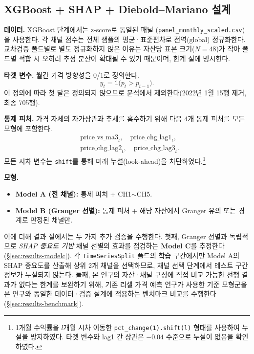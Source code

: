 \documentclass[11pt, a4paper, twocolumn]{article}
\begin{document}
\subsection{XGBoost + SHAP + Diebold--Mariano 설계}\label{sec:method-ml}

\textbf{데이터.} XGBoost 단계에서는 z-score로 통일된 패널
(\texttt{panel\_monthly\_scaled.csv})을 사용한다. 각 채널 점수는
전체 샘플의 평균·표준편차로 전역(global) 정규화한다. 교차검증 폴드별로
별도 정규화하지 않은 이유는 자산당 표본 크기($N=48$)가 작아 폴드별
적합 시 오히려 추정 분산이 확대될 수 있기 때문이며, 한계 절에 명시한다.

\textbf{타겟 변수.} 월간 가격 방향성을 0/1로 정의한다.
\[
  y_t = \mathbb{1}\bigl( p_t > p_{t-1} \bigr).
\]
이 정의에 따라 첫 달은 정의되지 않으므로 분석에서 제외한다(2022년
1월 15행 제거, 최종 705행).

\textbf{통제 피처.} 가격 자체의 자가상관과 추세를 흡수하기 위해 다음
4개 통제 피처를 모든 모형에 포함한다.
\begin{align*}
  &\mathrm{price\_vs\_ma3}_t,\quad \mathrm{price\_chg\_lag1}_t, \\
  &\mathrm{price\_chg\_lag2}_t,\quad \mathrm{price\_chg\_lag3}_t.
\end{align*}
모든 시차 변수는 \texttt{shift}를 통해 미래 누설(look-ahead)을
차단하였다.\footnote{1개월 수익률을 $l$개월 시차 이동한
\texttt{pct\_change(1).shift(l)} 형태를 사용하여 누설을 방지하였다.
타겟 변수와 lag1 간 상관은 $-0.04$ 수준으로 누설이 없음을 확인하였다.}

\textbf{모형.}
\begin{itemize}[leftmargin=1.4em, topsep=0pt, itemsep=0pt]
  \item \textbf{Model A (전 채널):} 통제 피처 + CH1$\sim$CH5.
  \item \textbf{Model B (Granger 선별):} 통제 피처 + 해당 자산에서
        Granger 유의 또는 경계로 판정된 채널만.
\end{itemize}
이에 더해 결과 절에서는 두 가지 추가 검증을 수행한다. 첫째, Granger
선별과 독립적으로 \emph{SHAP 중요도 기반} 채널 선별의 효과를 점검하는
\textbf{Model C}를 추정한다(\S\ref{sec:results-modelc}). 각
\texttt{TimeSeriesSplit} 폴드의 학습 구간에서만 Model A의 SHAP
중요도를 산출해 상위 2개 채널을 선택하므로, 채널 선택 단계에서 테스트
구간 정보가 누설되지 않는다. 둘째, 본 연구의 자산·채널 구성에 직접
비교 가능한 선행 결과가 없다는 한계를 보완하기 위해, 기존 리셀 가격
예측 연구\citep{radityaetal2021}가 사용한 기준 모형군을 본 연구와
동일한 데이터·검증 설계에 적용하는 벤치마크 비교를 수행한다
(\S\ref{sec:results-benchmark}).
\end{document}
